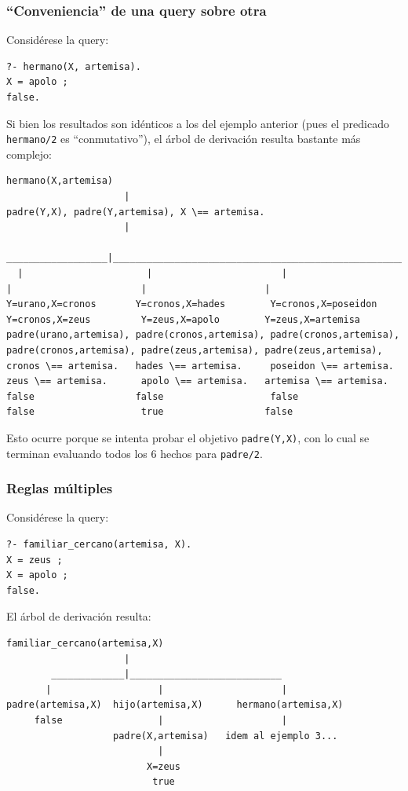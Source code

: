\documentclass[12pt,titlepage]{article}
\begin{document}
\subsubsection{``Conveniencia'' de una query sobre otra}

Considérese la query:
\begin{lstlisting}
?- hermano(X, artemisa).
X = apolo ;
false.
\end{lstlisting}

Si bien los resultados son idénticos a los del ejemplo anterior (pues el predicado \lstinline|hermano/2| es ``conmutativo''), el árbol de derivación resulta bastante más complejo:
\begin{Verbatim}[samepage=true,fontsize=\tiny]
            hermano(X,artemisa)
                     |
padre(Y,X), padre(Y,artemisa), X \== artemisa.
                     |
   __________________|_________________________________________________________________________________________________
  |                      |                       |                       |                       |                     |
Y=urano,X=cronos       Y=cronos,X=hades        Y=cronos,X=poseidon     Y=cronos,X=zeus         Y=zeus,X=apolo        Y=zeus,X=artemisa
padre(urano,artemisa), padre(cronos,artemisa), padre(cronos,artemisa), padre(cronos,artemisa), padre(zeus,artemisa), padre(zeus,artemisa),
cronos \== artemisa.   hades \== artemisa.     poseidon \== artemisa.  zeus \== artemisa.      apolo \== artemisa.   artemisa \== artemisa.
false                  false                   false                   false                   true                  false
\end{Verbatim}

Esto ocurre porque se intenta probar el objetivo \lstinline|padre(Y,X)|, con lo cual se terminan evaluando todos los 6 hechos para \lstinline|padre/2|.

\subsubsection{Reglas múltiples}

Considérese la query:
\begin{lstlisting}
?- familiar_cercano(artemisa, X).
X = zeus ;
X = apolo ;
false.
\end{lstlisting}

El árbol de derivación resulta:
\begin{Verbatim}[samepage=true,fontsize=\small]
            familiar_cercano(artemisa,X)
                     |
        _____________|___________________________
       |                   |                     |
padre(artemisa,X)  hijo(artemisa,X)      hermano(artemisa,X)
     false                 |                     |
                   padre(X,artemisa)   idem al ejemplo 3...
                           |
                         X=zeus
                          true
\end{Verbatim}
\end{document}
